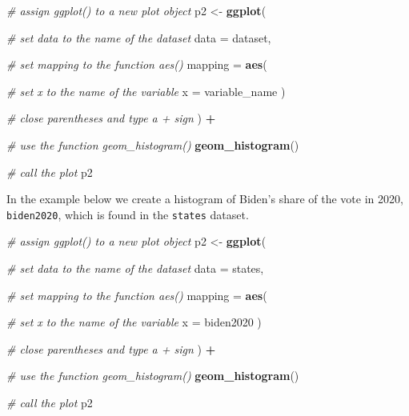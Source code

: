 \documentclass[
]{book}
\newenvironment{Shaded}{\begin{snugshade}}{\end{snugshade}}
\newcommand{\AttributeTok}[1]{\textcolor[rgb]{0.13,0.29,0.53}{#1}}
\newcommand{\CommentTok}[1]{\textcolor[rgb]{0.56,0.35,0.01}{\textit{#1}}}
\newcommand{\FunctionTok}[1]{\textcolor[rgb]{0.13,0.29,0.53}{\textbf{#1}}}
\newcommand{\NormalTok}[1]{#1}
\newcommand{\OtherTok}[1]{\textcolor[rgb]{0.56,0.35,0.01}{#1}}
\newcommand{\SpecialCharTok}[1]{\textcolor[rgb]{0.81,0.36,0.00}{\textbf{#1}}}
\begin{document}
\begin{Shaded}
\begin{Highlighting}[]
\CommentTok{\# assign ggplot() to a new plot object}
\NormalTok{p2 }\OtherTok{\textless{}{-}} \FunctionTok{ggplot}\NormalTok{(}
  
  \CommentTok{\# set data to the name of the dataset}
  \AttributeTok{data =}\NormalTok{ dataset,}
  
  \CommentTok{\# set \textasciigrave{}mapping\textasciigrave{} to the function \textasciigrave{}aes()\textasciigrave{}}
  \AttributeTok{mapping =} \FunctionTok{aes}\NormalTok{(}
    
    \CommentTok{\# set \textasciigrave{}x\textasciigrave{} to the name of the variable}
    \AttributeTok{x =}\NormalTok{ variable\_name}
\NormalTok{  )}
  
  \CommentTok{\# close parentheses and type a + sign}
\NormalTok{) }\SpecialCharTok{+}
  
  \CommentTok{\# use the function \textasciigrave{}geom\_histogram()\textasciigrave{}}
  \FunctionTok{geom\_histogram}\NormalTok{()}

\CommentTok{\# call the plot}
\NormalTok{p2}
\end{Highlighting}
\end{Shaded}

In the example below we create a histogram of Biden's share of the vote in 2020, \texttt{biden2020}, which is found in the \texttt{states} dataset.

\begin{Shaded}
\begin{Highlighting}[]
\CommentTok{\# assign ggplot() to a new plot object}
\NormalTok{p2 }\OtherTok{\textless{}{-}} \FunctionTok{ggplot}\NormalTok{(}
  
  \CommentTok{\# set data to the name of the dataset}
  \AttributeTok{data =}\NormalTok{ states,}
  
  \CommentTok{\# set \textasciigrave{}mapping\textasciigrave{} to the function \textasciigrave{}aes()\textasciigrave{}}
  \AttributeTok{mapping =} \FunctionTok{aes}\NormalTok{(}
    
    \CommentTok{\# set \textasciigrave{}x\textasciigrave{} to the name of the variable}
    \AttributeTok{x =}\NormalTok{ biden2020}
\NormalTok{  )}
  
  \CommentTok{\# close parentheses and type a + sign}
\NormalTok{) }\SpecialCharTok{+}
  
  \CommentTok{\# use the function \textasciigrave{}geom\_histogram()\textasciigrave{}}
  \FunctionTok{geom\_histogram}\NormalTok{()}

\CommentTok{\# call the plot}
\NormalTok{p2}
\end{Highlighting}
\end{Shaded}
\end{document}
